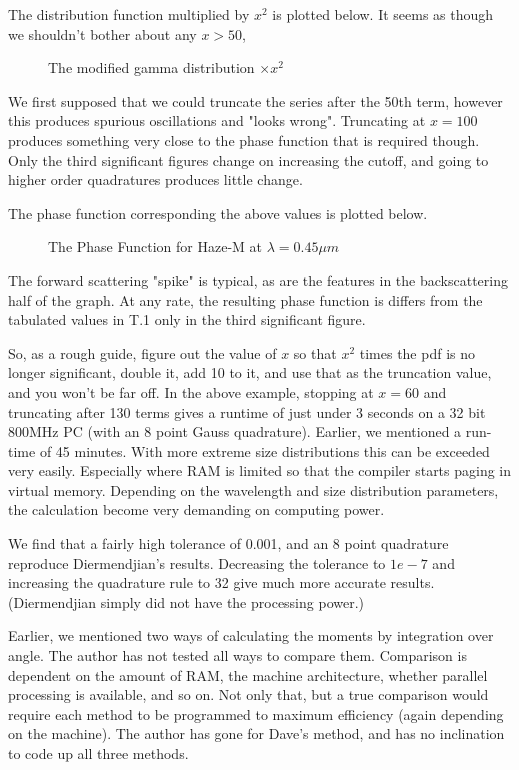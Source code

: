 \begin{flushleft}
The distribution function multiplied by $x^2$ is plotted below. It seems
as though we shouldn't bother about any $x>50$, 
\vspace*{14cm}
\begin{figure}[htb]
\caption{ The modified gamma distribution $\times x^2$  }
\end{figure}

We first supposed that we could truncate the series after the 50th term,
 however this produces spurious oscillations and "looks wrong". Truncating 
at $x=100$ produces something very close to the phase function that is
required though. Only the third significant figures change on increasing
the cutoff, and going to higher order quadratures produces little change.

The phase function corresponding the above values is plotted below.
\vspace*{14cm}
\begin{figure}[htb]
\caption{The Phase Function for Haze-M at $\lambda=0.45 \mu m$ }
\end{figure}
The forward scattering "spike" is typical, as are the features in the backscattering
half of the graph. At any rate, the resulting phase function is differs
from the tabulated values in T.1 only in the third significant figure.

So, as a rough guide, figure out the value of $x$ so that $x^2$ times the pdf
is no longer significant, double it, add 10 to it, and use that as the truncation
 value, and you won't be far off. In the above example, stopping at $x=60$
 and truncating after 130 terms gives a runtime of just under 3 seconds
on a 32 bit 800MHz PC (with an 8 point Gauss quadrature). Earlier, we mentioned
a run-time of 45 minutes. With more extreme size distributions this can be exceeded very easily.
 Especially where RAM is limited so that the compiler starts paging in
virtual memory.
 Depending on the wavelength and size distribution parameters, the calculation
become very demanding on computing power.

We find that a fairly high tolerance of 0.001, and an 8 point quadrature reproduce
Diermendjian's results. Decreasing the tolerance to $1e-7$ and increasing the
quadrature rule to 32 give much more accurate results. (Diermendjian simply did not
have the processing power.) 

Earlier, we mentioned two ways of calculating the moments by integration over angle.
The author has not tested all ways to compare them. Comparison is dependent on the amount of RAM, the machine architecture, whether parallel processing is available, and so on. 
Not only that, but a true comparison would require each method to be programmed to maximum
efficiency (again depending on the machine). The author has gone for Dave's method, and
has no inclination to code up all three methods.


\end{flushleft}







